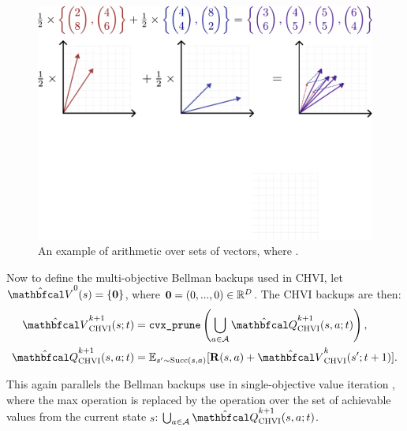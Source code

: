         \begin{figure}
            \centering\includegraphics[width=1.0\textwidth]{figures/ch2/ch_arithmetic.pdf} 
            \caption[An example of arithmetic over sets of vectors.]{An example of arithmetic over sets of vectors, where .}
            \label{fig:vectorset_arithmetic}
        \end{figure}

        Now to define the multi-objective Bellman backups used in CHVI, let $\hat{\bfcl{V}}^0(s) = \{ \bff{0} \}$, where $\mathbf{0}=(0,...,0)\in\mathbb{R}^D$. The CHVI backups are then:
        \begin{align}
            \Vchvi^{k+1}(s;t) &= \cprune \left( \bigcup_{a\in\cl{A}} \Qchvi^{k+1}(s,a;t) \right), \\
            \Qchvi^{k+1}(s,a;t) &= \bb{E}_{s'\sim \suc{s}{a}} [\bff{R}(s,a) + \Vchvi^k(s';t+1)].
        \end{align}
        
        This again parallels the Bellman backups use in single-objective value iteration , where the max operation is replaced by the \cprune\ewe operation over the set of achievable values from the current state $s$: $\bigcup_{a\in\cl{A}} \Qchvi^{k+1}(s,a;t)$.

